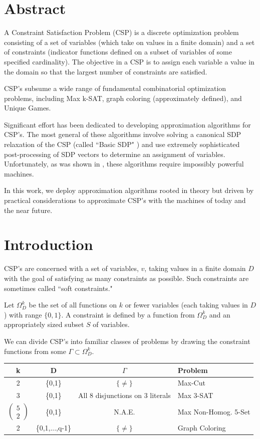\documentclass[11pt]{article} %
\begin{document}
\section*{Abstract}

A Constraint Satisfaction Problem (CSP) is a discrete optimization problem consisting of a set of variables (which take on values in a finite domain) and a set of constraints (indicator functions defined on a subset of variables of some specified cardinality). The objective in a CSP is to assign each variable a value in the domain so that the largest number of constraints are satisfied.

CSP's subsume a wide range of fundamental combinatorial optimization problems, including Max k-SAT, graph coloring (approximately defined), and Unique Games.

Significant effort has been dedicated to developing approximation algorithms for CSP's. The most general of these algorithms involve solving a canonical SDP relaxation of the CSP (called ``Basic SDP" \cite{raghavendra2008optimal}) and use extremely sophisticated post-processing of SDP vectors to determine an assignment of variables. Unfortunately, as was shown in \cite{dwivedi2015introduction}, these algorithms require impossibly powerful machines.

In this work, we deploy approximation algorithms rooted in theory but driven by practical considerations to approximate CSP's with the machines of today and the near future. 

\section{Introduction}

CSP's are concerned with a set of variables, $v$, taking values in a finite domain $D$ with the goal of satisfying as many constraints as possible. Such constraints are sometimes called ``soft constraints."

Let $\Omega_D^k$ be the set of all functions on $k$ or fewer variables (each taking values in $D$) with range $\{ 0,1 \}$. A constraint is defined by a function from $\Omega_D^k$ and an appropriately sized subset $S$ of variables.

We can divide CSP's into familiar classes of problems by drawing the constraint functions from some $\Gamma \subset \Omega_D^k$.

\begin{tabular}{c c c l}
\hline
k & D & $\Gamma$ & Problem \\
\hline
2 & \{0,1\} & $\{\neq\}$ & Max-Cut \\
3 & \{0,1\} & All 8 disjunctions on 3 literals & Max 3-SAT \\
$\left(\begin{array}{c}
      5 \\
      2
    \end{array}\right)$
& \{0,1\} & N.A.E. & Max Non-Homog. 5-Set \\
2 & \{0,1,...,q-1\} & $\{\neq\}$ & Graph Coloring \\
\hline
\end{tabular}
\end{document}
